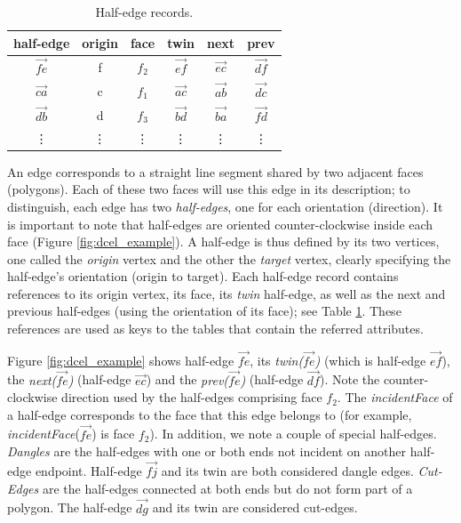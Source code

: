 \begin{table} 
\begin{minipage}{\textwidth}
    \small
    \centering
    \caption{Half-edge records.}\label{tab:hedges}
    \begin{tabular}{c c c c c c} 
        \toprule
        half-edge & origin & face & twin & next & prev \\
        \midrule
        $\vec{fe}$ & f & $f_2$  & $\vec{ef}$ & $\vec{ec}$ & $\vec{df}$ \\
        $\vec{ca}$ & c & $f_1$  & $\vec{ac}$ & $\vec{ab}$ & $\vec{dc}$ \\
        $\vec{db}$ & d & $f_3$  & $\vec{bd}$ & $\vec{ba}$ & $\vec{fd}$ \\
        \vdots     & \vdots & \vdots & \vdots     & \vdots     & \vdots     \\
        \bottomrule
    \end{tabular}
\end{minipage}
\end{table}

An edge corresponds to a straight line segment shared by two adjacent faces (polygons). Each of these two faces will use this edge in its description; to distinguish, each edge has two \textit{half-edges}, one for each orientation (direction). It is important to note that half-edges are oriented counter-clockwise inside each face (Figure \ref{fig:dcel_example}). A half-edge is thus defined by its two vertices, one called the \textit{origin} vertex and the other the \textit{target} vertex, clearly specifying the half-edge's orientation (origin to target). Each half-edge record contains references to its origin vertex, its face, its \textit{twin} half-edge, as well as the next and previous half-edges (using the orientation of its face); see Table \ref{tab:hedges}. These references are used as keys to the tables that contain the referred attributes. 

Figure \ref{fig:dcel_example} shows half-edge $\overrightarrow{fe}$, its \textit{twin($\overrightarrow{fe}$)} (which is half-edge $\overrightarrow{ef}$), the \textit{next($\overrightarrow{fe}$)} (half-edge $\overrightarrow{ec}$) and the \textit{prev($\overrightarrow{fe}$)} (half-edge $\overrightarrow{df}$). Note the counter-clockwise direction used by the half-edges comprising face $f_2$. The \textit{incidentFace} of a half-edge corresponds to the face that this edge belongs to (for example, \textit{incidentFace}($\overrightarrow{fe}$) is face $f_2$). 
In addition, we note a couple of special half-edges. 
\textit{Dangles} are the half-edges with one or both ends not incident on another half-edge endpoint. Half-edge \textit{$\overrightarrow{fj}$} and its twin are both considered dangle edges.
\textit{Cut-Edges} are the half-edges connected at both ends but do not form part of a polygon. 
The half-edge \textit{$\overrightarrow{dg}$} and its twin are considered cut-edges.

